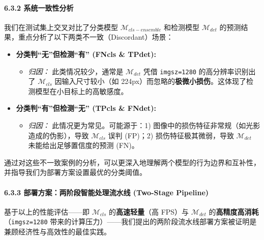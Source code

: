 \documentclass[
]{article}
\begin{document}
\paragraph{\texorpdfstring{\textbf{6.3.2
}系统一致性分析}{6.3.2 系统一致性分析}}\label{632-ux7cfbux7edfux4e00ux81f4ux6027ux5206ux6790}

我们在测试集上交叉对比了分类模型 \(\mathcal{M}_{cls-ensemble}\)
和检测模型 \(\mathcal{M}_{det}\)
的预测结果，重点分析了以下两类不一致（Discordant）场景：

\begin{itemize}
\item
  \textbf{分类判``无''但检测``有'' (FNcls \& TPdet):}

  \begin{itemize}
  \item
    \emph{归因：} 此类情况较少，通常是 \(\mathcal{M}_{det}\) 凭借
    \texttt{imgsz=1280} 的高分辨率识别出了 \(\mathcal{M}_{cls}\)
    因输入尺寸较小（如
    224px）而忽略的\textbf{极微小损伤}。这体现了检测模型在小目标上的高敏感度。
  \end{itemize}
\item
  \textbf{分类判``有''但检测``无'' (TPcls \& FNdet):}

  \begin{itemize}
  \item
    \emph{归因：} 此情况更为常见。可能源于：1)
    图像中的损伤特征非常规（如光影造成的伪影），导致
    \(\mathcal{M}_{cls}\) 误判 (FP)；2) 损伤特征极其微弱，导致
    \(\mathcal{M}_{det}\) 未能给出足够置信度的预测 (FN)。
  \end{itemize}
\end{itemize}

通过对这些不一致案例的分析，可以更深入地理解两个模型的行为边界和互补性，并指导我们为部署方案设置最优的分类阈值。

\paragraph{\texorpdfstring{\textbf{6.3.3 部署方案：两阶段智能处理流水线
(Two-Stage
Pipeline)}}{6.3.3 部署方案：两阶段智能处理流水线 (Two-Stage Pipeline)}}\label{633-ux90e8ux7f72ux65b9ux6848ux4e24ux9636ux6bb5ux667aux80fdux5904ux7406ux6d41ux6c34ux7ebf-two-stage-pipeline}

基于以上的性能评估------即 \(\mathcal{M}_{cls}\) 的\textbf{高速轻量}（高
FPS）与 \(\mathcal{M}_{det}\)
的\textbf{高精度高消耗}（\texttt{imgsz=1280}
带来的计算压力）------我们提出的两阶段流水线部署方案被证明是兼顾经济性与高效性的最佳实践。
\end{document}
